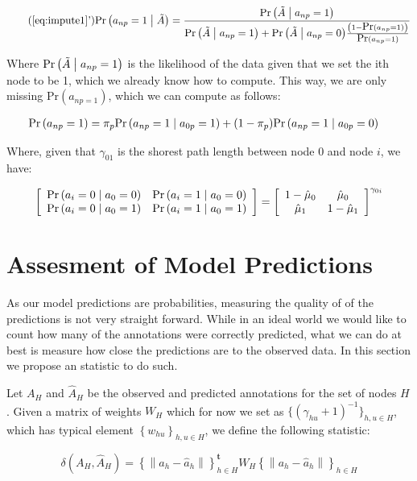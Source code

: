\documentclass[12pt]{article}
\renewcommand{\Pr}[1]{{\mbox{Pr}\left(#1\right) }}
\newcommand{\Prcond}[2]{{\mbox{Pr}\left(#1\;\vphantom{#2}\right|\left.\vphantom{#1}#2\right) }}
\begin{document}
\begin{equation}
\tag{\ref*{eq:impute1}'}
\Prcond{a_{np} = 1}{\tilde A} = \frac{\Prcond{\tilde A}{a_{np} = 1}}{
\Prcond{\tilde A}{a_{np} = 1} + \Prcond{\tilde A}{a_{np} = 0} \frac{\left(1 - \Pr{a_{np} = 1}\right)}{\Pr{a_{np} = 1}}
}
\end{equation}

Where $\Prcond{\tilde A}{a_{np} = 1}$ is the likelihood of the data given that we set the ith node to be 1, which we already know how to compute. This way, we are only missing $\Pr{a_{np=1}}$, which we can compute as follows:

\begin{align*}
\Pr{a_{np} = 1} & = \pi_p \Prcond{a_{np} = 1}{a_{0p} = 1} + (1 - \pi_p) \Prcond{a_{np} = 1}{a_{0p} = 0}
\end{align*}


Where, given that $\gamma_{01}$ is the shorest path length between node 0 and node $i$, we have:

$$
\left[\begin{array}{cc}
\Prcond{a_i = 0}{a_0 = 0} & \Prcond{a_i = 1}{a_0 = 0} \\
\Prcond{a_i = 0}{a_0 = 1} & \Prcond{a_i = 1}{a_0 = 1}
\end{array}
\right]
=
\left[\begin{array}{cc}
1 - \hat\mu_0 &  \hat\mu_0 \\
\hat\mu_1 &  1 - \hat\mu_1
\end{array}
\right]^{\gamma_{0i}}
$$


\section{Assesment of Model Predictions}

As our model predictions are probabilities, measuring the quality of of the predictions is not very straight forward. While in an ideal world we would like to count how many of the annotations were correctly predicted, what we can do at best is measure how close the predictions are to the observed data. In this section we propose an statistic to do such.

Let $A_H$ and $\hat A_H$ be the observed and predicted annotations for the set of nodes $H$. Given a matrix of weights $W_H$ which for now we set as $\{\left(\gamma_{hu} + 1\right)^{-1}\}_{h,u\in H}$, which has typical element $\left\{ {w_{hu}} \right\}_{h, u\in H}$, we define the following statistic:

\begin{equation}
\label{eq:delta1}
\delta\left(A_H, \hat A_H\right) = \left\{\left\| a_h - \hat a_h \right\|\right\}_{h \in H}^\mathbf{t}
W_H
\left\{\left\| a_h - \hat a_h \right\|\right\}_{h \in H}
\end{equation}
\end{document}
